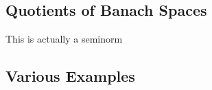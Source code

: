 \documentclass[prb,12pt]{revtex4-2}
\theoremstyle{definition}
\theoremstyle{definition}
\theoremstyle{definition}
\begin{document}
	\subsection{Quotients of Banach Spaces}
	\begin{Definition}
	\end{Definition}
	\begin{Theorem}
		This is actually a seminorm
	\end{Theorem}
	\begin{Theorem}
	\end{Theorem}
	\subsection{Various Examples}
\end{document}
